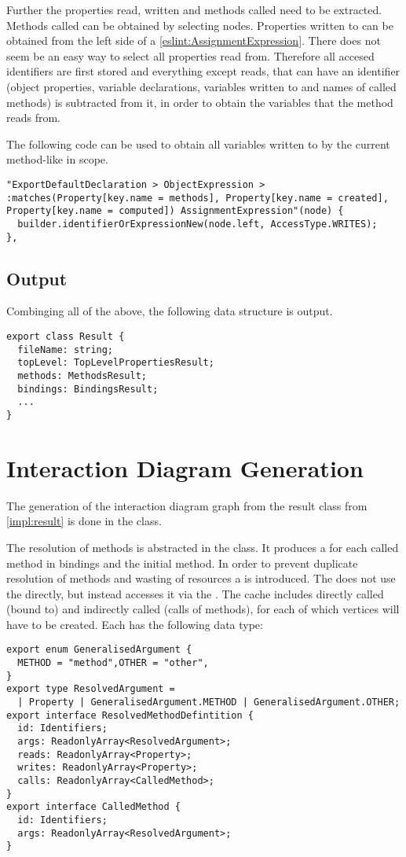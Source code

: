 Further the properties read, written and methods called need to be extracted. Methods called can be obtained by selecting  nodes. Properties written to can be obtained from the left side of a  \ref{eslint:AssignmentExpression}.
There does not seem be an easy way to select all properties read from. Therefore all accesed identifiers are first stored and everything except reads, that can have an identifier (object properties, variable declarations, variables written to and names of called methods) is subtracted from it, in order to obtain the variables that the method reads from.

The following code can be used to obtain all variables written to by the current method-like in scope. 
\begin{lstlisting}
"ExportDefaultDeclaration > ObjectExpression > 
:matches(Property[key.name = methods], Property[key.name = created],
Property[key.name = computed]) AssignmentExpression"(node) {
  builder.identifierOrExpressionNew(node.left, AccessType.WRITES);
},
\end{lstlisting}
\subsection{Output}
Combinging all of the above, the following data structure is output.
\begin{lstlisting}
export class Result {
  fileName: string;
  topLevel: TopLevelPropertiesResult;
  methods: MethodsResult;
  bindings: BindingsResult;
  ...
}
\end{lstlisting}
\label{impl:result}
\section{Interaction Diagram Generation}
The generation of the interaction diagram graph from the result class from \ref{impl:result} is done in the  class. 

The resolution of methods is abstracted in the  class. It produces a 
 for each called method in bindings and the initial method. In order to prevent duplicate resolution of methods and wasting of resources a  is introduced. The  does not use the  directly, but instead accesses it via the . The cache includes directly called (bound to) and indirectly called (calls of methods), for each of which vertices will have to be created. 
Each  has the following data type:
\begin{lstlisting}
export enum GeneralisedArgument {
  METHOD = "method",OTHER = "other",
}
export type ResolvedArgument =
  | Property | GeneralisedArgument.METHOD | GeneralisedArgument.OTHER;
export interface ResolvedMethodDefintition {
  id: Identifiers;
  args: ReadonlyArray<ResolvedArgument>;
  reads: ReadonlyArray<Property>;
  writes: ReadonlyArray<Property>;
  calls: ReadonlyArray<CalledMethod>;
}
export interface CalledMethod {
  id: Identifiers;
  args: ReadonlyArray<ResolvedArgument>;
}
\end{lstlisting}


